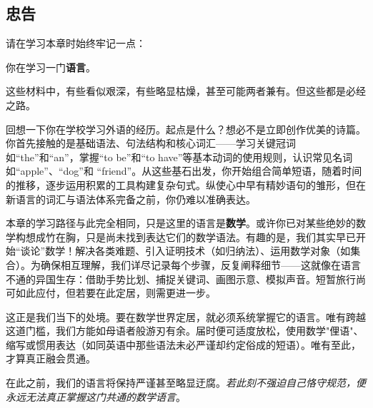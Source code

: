 \subsection{忠告}

请在学习本章时始终牢记一点：
\begin{center}
    你在学习一门\textbf{语言}。
\end{center}

这些材料中，有些看似艰深，有些略显枯燥，甚至可能两者兼有。但这些都是必经之路。

回想一下你在学校学习外语的经历。起点是什么？想必不是立即创作优美的诗篇。你首先接触的是基础语法、句法结构和核心词汇——学习关键冠词如``the''和``an''，掌握``to be''和``to have''等基本动词的使用规则，认识常见名词如``apple''、``dog''和 ``friend''。从这些基石出发，你开始组合简单短语，随着时间的推移，逐步运用积累的工具构建复杂句式。纵使心中早有精妙语句的雏形，但在新语言的词汇与语法体系完备之前，你仍难以准确表达。

本章的学习路径与此完全相同，只是这里的语言是\textbf{数学}。或许你已对某些绝妙的数学构想成竹在胸，只是尚未找到表达它们的数学语法。有趣的是，我们其实早已开始``谈论''数学！解决各类难题、引入证明技术（如归纳法）、运用数学对象（如集合）。为确保相互理解，我们详尽记录每个步骤，反复阐释细节——这就像在语言不通的异国生存：借助手势比划、捕捉关键词、画图示意、模拟声音。短暂旅行尚可如此应付，但若要在此定居，则需更进一步。


这正是我们当下的处境。要在数学世界定居，就必须系统掌握它的语言。唯有跨越这道门槛，我们方能如母语者般游刃有余。届时便可适度放松，使用数学"俚语"、缩写或惯用表达（如同英语中那些语法未必严谨却约定俗成的短语）。唯有至此，才算真正融会贯通。

在此之前，我们的语言将保持严谨甚至略显迂腐。\emph{若此刻不强迫自己恪守规范，便永远无法真正掌握这门共通的数学语言}。
